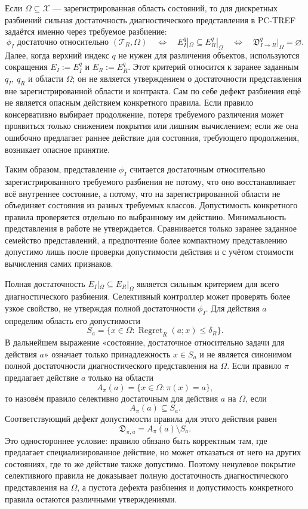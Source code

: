Если $\Omega\subseteq\mathcal X$ --- зарегистрированная область состояний, то
для дискретных разбиений сильная достаточность диагностического представления в
PC-TREF задаётся именно через требуемое разбиение:
\[
  \phi_I\text{ достаточно относительно }(\mathcal T_R,\Omega)
  \quad\Longleftrightarrow\quad
  E_I^q|_{\Omega}\subseteq E_R^q|_{\Omega}
  \quad\Longleftrightarrow\quad
  \mathfrak D_{I\to R}^{q}|_{\Omega}=\varnothing.
\]
Далее, когда верхний индекс $q$ не нужен для различения объектов, используются
сокращения $E_I:=E_I^q$ и $E_R:=E_R^q$. Этот критерий относится к заранее
заданным $q_I$, $q_R$ и области $\Omega$; он не является утверждением о достаточности представления вне зарегистрированной
области и контракта.
Сам по себе дефект разбиения ещё не является опасным действием конкретного
правила. Если правило консервативно выбирает продолжение, потеря требуемого
различения может проявиться только снижением покрытия или лишним вычислением;
если же она ошибочно предлагает раннее действие для состояния, требующего
продолжения, возникает опасное принятие.

Таким образом, представление $\phi_I$ считается достаточным относительно
зарегистрированного требуемого разбиения не потому, что оно восстанавливает всё
внутреннее состояние, а потому, что на зарегистрированной области не объединяет
состояния из разных требуемых классов. Допустимость конкретного правила
проверяется отдельно по выбранному им действию. Минимальность
представления в работе не утверждается. Сравнивается только заранее заданное
семейство представлений, а предпочтение более компактному представлению
допустимо лишь после проверки допустимости действия и с учётом стоимости вычисления
самих признаков.


Полная достаточность $E_I|_\Omega\subseteq E_R|_\Omega$ является сильным
критерием для всего диагностического разбиения. Селективный контроллер может
проверять более узкое свойство, не утверждая полной достаточности $\phi_I$.
Для действия $a$ определим область его допустимости
\[
  S_a=\{x\in\Omega:\operatorname{Regret}_R(a;x)\leq\delta_R\}.
\]
В дальнейшем выражение «состояние, достаточное относительно задачи для действия
$a$» означает только принадлежность $x\in S_a$ и не является синонимом
полной достаточности диагностического представления на $\Omega$. Если правило
$\pi$ предлагает действие $a$ только на области
\[
  A_{\pi}(a)=\{x\in\Omega:\pi(x)=a\},
\]
то назовём правило селективно достаточным для действия $a$ на $\Omega$, если
\[
  A_{\pi}(a)\subseteq S_a.
\]
Соответствующий дефект допустимости правила для этого действия равен
\[
  \mathfrak D_{\pi,a}=A_{\pi}(a)\setminus S_a.
\]
Это одностороннее условие: правило обязано быть корректным там, где предлагает
специализированное действие, но может отказаться от него на других состояниях,
где то же действие также допустимо. Поэтому ненулевое покрытие селективного
правила не доказывает полную достаточность диагностического представления на
$\Omega$, а пустота дефекта разбиения и допустимость конкретного правила
остаются различными утверждениями.

